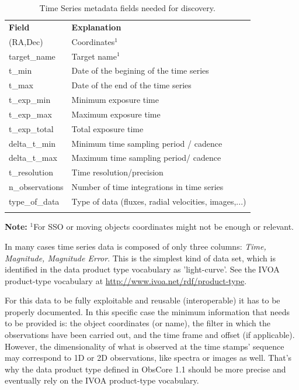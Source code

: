 \documentclass[11pt,a4paper]{ivoa}
\begin{document}
\begin{table}[hb]
  \begin{center}
  \caption{Time Series metadata fields needed for discovery.}
  \label{tab:fields}
    \begin{tabular}{p{}p{}}
      \sptablerule
      \textbf{Field}  & \textbf{Explanation}                        \\\sptablerule
      (RA,Dec)        & Coordinates$^1$                             \\
      target\_name    & Target name$^1$                             \\
      t\_min          & Date of the begining of the time series  \\
      t\_max          & Date of the end of the time series          \\
      t\_exp\_min     & Minimum exposure time                       \\
      t\_exp\_max     & Maximum exposure time                       \\
      t\_exp\_total   & Total exposure time                         \\
      delta\_t\_min   & Minimum time sampling period / cadence             \\
      delta\_t\_max   & Maximum time sampling period/ cadence             \\
      t\_resolution   & Time resolution/precision                   \\
      n\_observations & Number of time integrations  in time series         \\
      type\_of\_data  & Type of data (fluxes, radial velocities, images,...)\\
      \sptablerule
    \end{tabular}
  \end{center}
  \textbf{Note:} $^1$For SSO or moving objects coordinates might not be enough or relevant.
\end{table}

In many cases time series data is composed of only three columns: \emph{Time, Magnitude, Magnitude Error}.
This is the simplest kind of data set,  which is identified in the data product type vocabulary as 'light-curve'.
See the IVOA product-type vocabulary at \url{http://www.ivoa.net/rdf/product-type}.

For this data to be fully exploitable and reusable (interoperable) it has to be properly documented. In this specific case the minimum information that needs to be provided is: the object coordinates (or name), the filter in which the observations have been carried out, and the time frame and offset (if applicable).
However, the dimensionality of what is observed at the time stamps' sequence may correspond to 1D or 2D observations, like spectra or images  as well.
That's why the data product type  defined in ObsCore 1.1 should be more precise and eventually rely on the IVOA product-type vocabulary.
\end{document}
